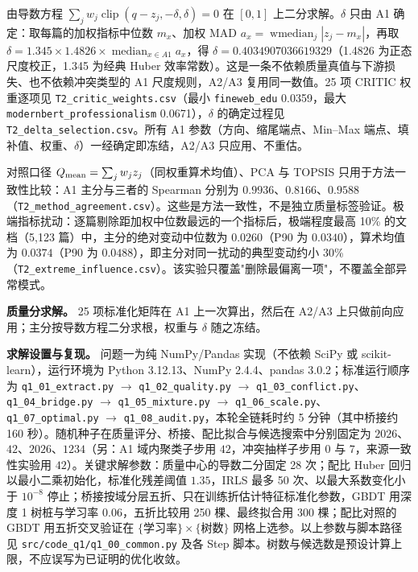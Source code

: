 由导数方程 $\sum_jw_j\operatorname{clip}(q-z_j,-\delta,\delta)=0$ 在 $[0,1]$ 上二分求解。$\delta$ 只由 A1 确定：取每篇的加权指标中位数 $m_x$、加权 MAD $a_x=\operatorname{wmedian}_j|z_j-m_x|$，再取 $\delta=1.345\times1.4826\times\operatorname{median}_{x\in A1}a_x$，得 $\delta=0.4034907036619329$（1.4826 为正态尺度校正，1.345 为经典 Huber 效率常数）。这是一条不依赖质量真值与下游损失、也不依赖冲突类型的 A1 尺度规则，A2/A3 复用同一数值。25 项 CRITIC 权重逐项见 \texttt{T2\_critic\_weights.csv}（最小 \texttt{fineweb\_edu} 0.0359，最大 \texttt{modernbert\_professionalism} 0.0671），$\delta$ 的确定过程见 \texttt{T2\_delta\_selection.csv}。所有 A1 参数（方向、缩尾端点、Min–Max 端点、填补值、权重、$\delta$）一经确定即冻结，A2/A3 只应用、不重估。

对照口径 $Q_{\rm mean}=\sum_jw_jz_j$（同权重算术均值）、PCA 与 TOPSIS 只用于方法一致性比较：A1 主分与三者的 Spearman 分别为 $0.9936$、$0.8166$、$0.9588$（\texttt{T2\_method\_agreement.csv}）。这些是方法一致性，不是独立质量标签验证。极端指标扰动：逐篇剔除距加权中位数最远的一个指标后，极端程度最高 10\% 的文档（5,123 篇）中，主分的绝对变动中位数为 $0.0260$（P90 为 $0.0340$），算术均值为 $0.0374$（P90 为 $0.0488$），即主分对同一扰动的典型变动约小 30\%（\texttt{T2\_extreme\_influence.csv}）。该实验只覆盖"删除最偏离一项"，不覆盖全部异常模式。

\textbf{质量分求解。} 25 项标准化矩阵在 A1 上一次算出，然后在 A2/A3 上只做前向应用；主分按导数方程二分求根，权重与 $\delta$ 随之冻结。

\textbf{求解设置与复现。} 问题一为纯 NumPy/Pandas 实现（不依赖 SciPy 或 scikit-learn），运行环境为 Python 3.12.13、NumPy 2.4.4、pandas 3.0.2；标准运行顺序为 \texttt{q1\_01\_extract.py} $\to$ \texttt{q1\_02\_quality.py} $\to$ \texttt{q1\_03\_conflict.py}、\texttt{q1\_04\_bridge.py} $\to$ \texttt{q1\_05\_mixture.py} $\to$ \texttt{q1\_06\_scale.py}、\texttt{q1\_07\_optimal.py} $\to$ \texttt{q1\_08\_audit.py}，本轮全链耗时约 5 分钟（其中桥接约 160 秒）。随机种子在质量评分、桥接、配比拟合与候选搜索中分别固定为 $2026$、$42$、$2026$、$1234$（另：A1 域内聚类子步用 $42$，冲突抽样子步用 $0$ 与 $7$，来源一致性实验用 $42$）。关键求解参数：质量中心的导数二分固定 28 次；配比 Huber 回归以最小二乘初始化，标准化残差阈值 $1.35$，IRLS 最多 50 次、以最大系数变化小于 $10^{-8}$ 停止；桥接按域分层五折、只在训练折估计特征标准化参数，GBDT 用深度 1 树桩与学习率 $0.06$，五折比较用 250 棵、最终拟合用 300 棵；配比对照的 GBDT 用五折交叉验证在 $\{$学习率$\}\times\{$树数$\}$ 网格上选参。以上参数与脚本路径见 \texttt{src/code\_q1/q1\_00\_common.py} 及各 Step 脚本。树数与候选数是预设计算上限，不应误写为已证明的优化收敛。

